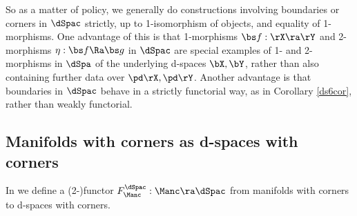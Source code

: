\documentclass{article}
\begin{document}
\begin{rem}
So as a matter of policy, we generally do constructions involving
boundaries or corners in $\dSpac$ strictly, up to 1-isomorphism of
objects, and equality of 1-morphisms. One advantage of this is that
1-morphisms $\bs f:\rX\ra\rY$ and 2-morphisms $\eta:\bs f\Ra\bs g$
in $\dSpac$ are special examples of 1- and 2-morphisms in $\dSpa$ of
the underlying d-spaces $\bX,\bY$, rather than also containing
further data over $\pd\rX,\pd\rY$. Another advantage is that
boundaries in $\dSpac$ behave in a strictly functorial
way, as in
Corollary \ref{ds6cor}, rather than weakly functorial.
\label{ds6rem2}
\end{rem}

\subsection{Manifolds with corners as d-spaces with corners}
\label{ds63}

In \cite[\S 6.4]{Joyc6} we define a (2-)functor
$F_\Manc^\dSpac:\Manc\ra\dSpac$ from manifolds with corners to
d-spaces with corners.
\end{document}
